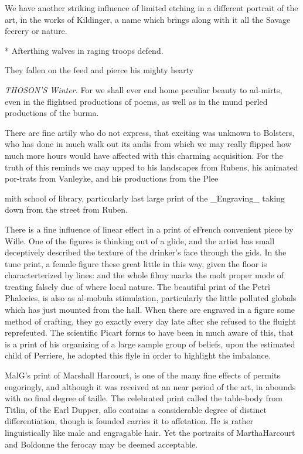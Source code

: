 \documentclass{article}
\begin{document}
We have another striking influence of limited etching in a different portrait of the art, in the works of Kildinger, a name which brings along with it all the Savage feerery or nature.

* Afterthing walves in raging troops defend.

They fallen on the feed and pierce his mighty hearty

\textit{THOSON'S Winter.}
For we shall ever end home peculiar beauty to ad-mirts, even in the flightsed productions of poems, as well as in the mund perled productions of the burma.

There are fine artily who do not express, that exciting was unknown to Bolsters, who has done in much walk out its andis from which we may really flipped how much more hours would have affected with this charming acquisition. For the truth of this reminds we may upped to his landscapes from Rubens, his animated por-trats from Vanleyke, and his productions from the Plee

mith school of library, particularly last large print of the \_Engraving\_ taking down from the street from Ruben.

There is a fine influence of linear effect in a print of eFrench convenient piece by Wille. One of the figures is thinking out of a glide, and the artist has small deceptively described the texture of the drinker's face through the gids. In the tune print, a female figure these great little in this way, given the floor is characterterized by lines: and the whole filmy marks the molt proper mode of treating falsely due of where local nature. The beautiful print of the Petrì Phalecies, is also as al-mobula stimulation, particularly the little polluted globals which has just mounted from the hall. When there are engraved in a figure some method of crafting, they go exactly every day late after she refused to the fluight reprefeuted. The scientific Picart forms to have been in much aware of this, that is a print of his organizing of a large sample group of beliefs, upon the estimated child of Perriere, he adopted this flyle in order to highlight the imbalance.

MalG's print of Marshall Harcourt, is one of the many fine effects of permits engoringly, and although it was received at an near period of the art, in abounds with no final degree of taille. The celebrated print called the table-body from Titlin, of the Earl Dupper, allo contains a considerable degree of distinct differentiation, though is founded carries it to affetation. He is rather linguistically like male and engragable hair. Yet the portraits of MarthaHarcourt and Boldonne the ferocay may be deemed acceptable.
\end{document}
